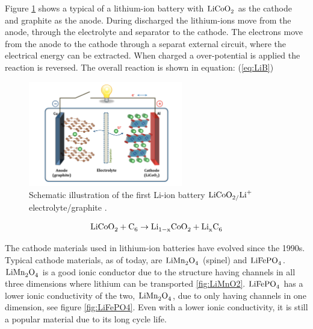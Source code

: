Figure \ref{fig:LiCoO2} shows a typical of a lithium-ion battery with $\ce{LiCoO_2}$ as the cathode and graphite as the anode. During discharged the lithium-ions move from the anode, through the electrolyte and separator to the cathode. The electrons move from the anode to the cathode through a separat external circuit, where the electrical energy can be extracted. When charged a over-potential is applied the reaction is reversed. The overall reaction is shown in equation: (\ref{eq:LiB})

\begin{figure}[H]
    \centering
    \includegraphics[width=0.6\textwidth]{Li-ion_inter.png}
    \caption{Schematic illustration of the first Li-ion battery $\ce{LiCoO_2/Li^+}$ electrolyte/graphite \cite{goodenough2013li}.}
    \label{fig:LiCoO2}
\end{figure}

\begin{align}\label{eq:LiB}
\ce{LiCoO_2} + \ce{C_6} \rightarrow \ce{Li_{1-x}CoO_2} + \ce{Li_xC_6}
\end{align}

The cathode materials used in lithium-ion batteries have evolved since the 1990s. Typical cathode materials, as of today, are $\ce{LiMn_2O_4}$ (spinel) and $\ce{LiFePO_4}$. $\ce{LiMn_2O_4}$ is a good ionic conductor due to the structure having channels in all three dimensions where lithium can be transported \ref{fig:LiMnO2}. $\ce{LiFePO_4}$ has a lower ionic conductivity of the two, $\ce{LiMn_2O_4}$, due to only having channels in one dimension, see figure \ref{fig:LiFePO4}. Even with a lower ionic conductivity, it is still a popular material due to its long cycle life. 

